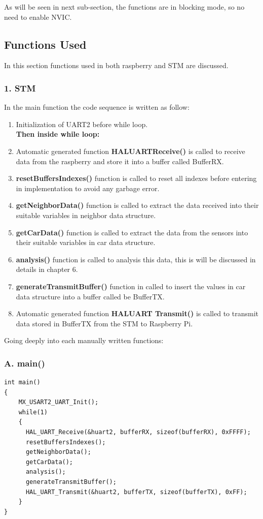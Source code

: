 As will be seen in next sub-section, the functions are in blocking mode, so no need to enable NVIC.

\subsection{Functions Used}
In this section functions used in both raspberry and STM are discussed.

\subsubsection{1. STM}

In the main function the code sequence is written as follow:

\begin{enumerate}
    \item Initialization of UART2 before while loop.\\
    \textbf{Then inside while loop:}
    \item Automatic generated function \textbf{HAL\textunderscore UART\textunderscore Receive()} is called to receive data from the raspberry and store it into a buffer called BufferRX.
    \item \textbf{resetBuffersIndexes()} function is called to reset all indexes before entering in implementation to avoid any garbage error.
    \item \textbf{getNeighborData()} function is called to extract the data received into their suitable variables in neighbor data structure.
    \item \textbf{getCarData()} function is called to extract the data from the sensors into their suitable variables in car data structure.
    \item \textbf{analysis() }function is called to analysis this data, this is will be discussed in details in chapter 6.
    \item \textbf{generateTransmitBuffer()} function in called to insert the values in car data structure into a buffer called be BufferTX.
    \item  Automatic generated function \textbf{HAL\textunderscore UART \textunderscore Transmit()} is called to transmit data stored in BufferTX from the STM to Raspberry Pi.
\end{enumerate}

Going deeply into each manually written functions:

\subsubsection{A. main()}
\begin{lstlisting}
int main()
{
    MX_USART2_UART_Init();
    while(1)
    {
      HAL_UART_Receive(&huart2, bufferRX, sizeof(bufferRX), 0xFFFF);
	  resetBuffersIndexes();
	  getNeighborData();
	  getCarData();
	  analysis();
	  generateTransmitBuffer();
	  HAL_UART_Transmit(&huart2, bufferTX, sizeof(bufferTX), 0xFF);
    }
}
\end{lstlisting}

